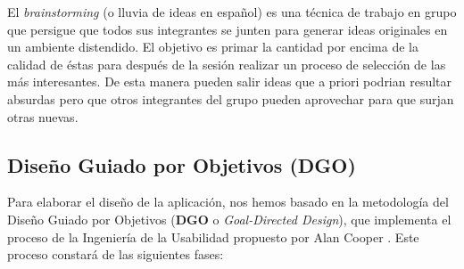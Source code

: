   El \textit{brainstorming} \cite{ref:bookBrainStorming} (o lluvia de ideas en español) es una técnica de trabajo en grupo que persigue que todos sus integrantes se junten para generar ideas originales en un ambiente distendido. El objetivo es primar la cantidad por encima de la calidad de éstas para después de la sesión realizar un proceso de selección de las más interesantes. De esta manera pueden salir ideas que a priori podrian resultar absurdas pero que otros integrantes del grupo pueden aprovechar para que surjan otras nuevas.  
  
  \subsection{Diseño Guiado por Objetivos (DGO)}\label{ssec:dgoDesign}
  
  Para elaborar el diseño de la aplicación, nos hemos basado en la metodología del Diseño Guiado por Objetivos (\textbf{DGO} o \textit{Goal-Directed Design}), que implementa el proceso de la Ingeniería de la Usabilidad propuesto por Alan Cooper \cite{ref:bookAlanCooper}. Este proceso constará de las siguientes fases:

